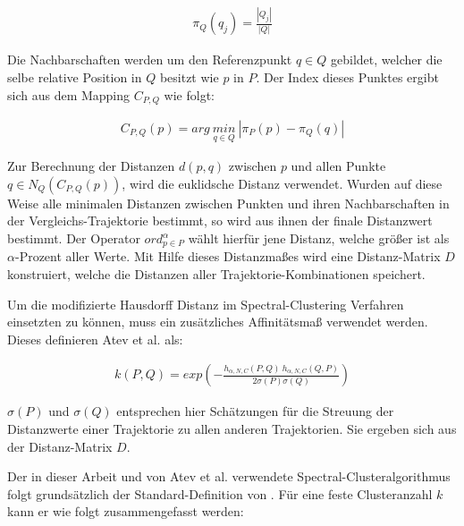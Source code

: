 \begin{ceqn}
\begin{align}
\label{eq_atev_relPos}
    \pi_Q(q_j) = \frac{|Q_j|}{|Q|}
\end{align}
\end{ceqn}

Die Nachbarschaften werden um den Referenzpunkt $q \in Q$ gebildet, welcher die selbe relative Position
in $Q$ besitzt wie $p$ in $P$. Der Index dieses Punktes ergibt sich aus dem Mapping $C_{P,Q}$ wie folgt:

\begin{ceqn}
\begin{align}
\label{eq_atev_findPointAtRelPow}
    C_{P,Q}(p) = arg\ \underset{q \in Q}{min}\ |\pi_P(p) - \pi_Q(q)|
\end{align}
\end{ceqn}

Zur Berechnung der Distanzen $d(p,q)$ zwischen $p$ und allen Punkte $q \in N_Q(C_{P,Q}(p))$, wird die euklidsche
Distanz verwendet. Wurden auf diese Weise alle minimalen Distanzen zwischen Punkten und ihren Nachbarschaften in
der Vergleichs-Trajektorie bestimmt, so wird aus ihnen der finale Distanzwert bestimmt. Der Operator
$ord_{p \in P}^{\alpha}$ wählt hierfür jene Distanz, welche größer ist als $\alpha$-Prozent aller Werte.
Mit Hilfe dieses Distanzmaßes wird eine Distanz-Matrix $D$ konstruiert, welche die Distanzen
aller Trajektorie-Kombinationen speichert.

Um die modifizierte Hausdorff Distanz im Spectral-Clustering Verfahren einsetzten zu können, muss ein
zusätzliches Affinitätsmaß verwendet werden.
Dieses definieren Atev et al. als:

\begin{ceqn}
\begin{align}
    k(P,Q) = exp (- \frac{h_{\alpha, N, C}(P,Q)\ h_{\alpha, N, C}(Q,P)}{2 \sigma(P) \sigma(Q)})
\end{align}
\end{ceqn}

$\sigma(P)$ und $\sigma(Q)$ entsprechen hier Schätzungen für die Streuung der Distanzwerte einer Trajektorie
zu allen anderen Trajektorien. Sie ergeben sich aus der Distanz-Matrix $D$.

Der in dieser Arbeit und von Atev et al. verwendete Spectral-Clusteralgorithmus folgt grundsätzlich
der Standard-Definition von \cite[]{Ng2002}.
Für eine feste Clusteranzahl $k$ kann er wie folgt zusammengefasst werden:

